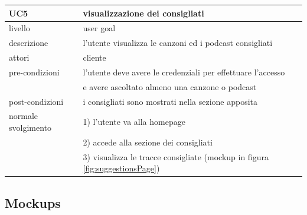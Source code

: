 \documentclass{article}
\begin{document}
  \begin{table}[H]
    \centering
    \begin{tabular}{|l|l|}
      \hline
      \textbf{UC5}                     & \textbf{visualizzazione dei consigliati}                                         \\
      \hline
      livello                          & user goal                                                                        \\
      \hline
      descrizione                      & l'utente visualizza le canzoni ed i podcast consigliati                          \\
      \hline
      attori                           & cliente                                                                          \\
      \hline
      pre-condizioni                   & l'utente deve avere le credenziali per effettuare l'accesso                      \\
      & e avere ascoltato almeno una canzone o podcast                                   \\
      \hline
      post-condizioni                  & i consigliati sono mostrati nella sezione apposita                               \\
      \hline
      normale svolgimento \hspace{5pt} & 1) l'utente va alla homepage                                                     \\
      & 2) accede alla sezione dei consigliati                                           \\
      & 3) visualizza le tracce consigliate (mockup in figura \ref{fig:suggestionsPage}) \\
      \hline
    \end{tabular}
    \label{tab:uct5}
  \end{table}

  \pagebreak

  \subsection{Mockups}
\end{document}
